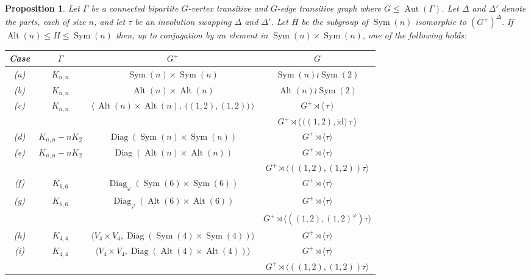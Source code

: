 \documentclass[11pt]{amsart}
\newtheorem{proposition}[theorem]{Proposition}
\DeclareMathOperator{\Sym}{Sym}
\DeclareMathOperator{\Alt}{Alt}
\DeclareMathOperator{\Aut}{Aut}
\DeclareMathOperator{\Diag}{Diag}
\begin{document}
\begin{proposition}\label{group-cases}
    Let $\Gamma$ be a connected bipartite $G$-vertex transitive and $G$-edge transitive graph where $G\leqslant \Aut(\Gamma)$. Let $\Delta$ and $\Delta'$ denote the parts, each of size $n$, and let $\tau$ be an involution swapping $\Delta$ and $\Delta'$. Let $H$ be the subgroup of $\Sym(n)$ isomorphic to  $(G^+)^\Delta$.
    If $\Alt(n)\leqslant H\leqslant \Sym(n)$ then, up to conjugation by an element in  $\Sym(n)\times \Sym(n)$, one of the following holds:
    \begin{table}[ht]
        \centering
        \begin{tabular}{c|ccc}
         Case&\(\Gamma\)&\(G^+\)&\(G\)  \\
         \hline
         (a) &\(K_{n,n}\)&\(\Sym(n) \times \Sym(n)\)&\(\Sym(n)\wr\Sym(2)\)\\
         \hline
         (b)&\(K_{n,n}\)&\(\Alt(n)\times \Alt(n)\)&\(\Alt(n)\wr\Sym(2)\)\\
         \hline
         (c)&\(K_{n,n}\)&\(\bigl\langle\, \Alt(n)\times \Alt(n),~ \bigl((1,2),(1,2)\bigr) \,\bigr\rangle\)&\(G^+\rtimes \langle\, \tau \,\rangle\)\\
         &&&\(G^+\rtimes \bigl\langle\, \bigl( (1,2), \mathrm{id} \bigr) \,\tau \,\bigr\rangle\)\\
         \hline
         (d)&\(K_{n,n}-nK_2\)&\(\Diag(\Sym(n)\times\Sym(n))\)&\(G^+\rtimes\langle\tau\rangle\)\\
         \hline
         (e)&\(K_{n,n}-nK_2\)&\(\Diag(\Alt(n)\times\Alt(n))\)&\(G^+\rtimes\langle\tau\rangle\)\\
         &&&\(G^+\rtimes \langle ((1,2),(1,2))\tau\rangle\)\\
         \hline
         (f)&\(K_{6,6}\)&\(\Diag_\varphi(\Sym(6)\times\Sym(6))\)&\(G^+\rtimes\langle \tau\rangle\)\\
         \hline
         (g)&\(K_{6,6}\)&\(\Diag_\varphi(\Alt(6)\times\Alt(6))\)&\(G^+\rtimes\langle \tau\rangle\)\\
         &&&\(G^+\rtimes\langle((1,2),(1,2)^\varphi) \tau\rangle\)\\
         \hline
         (h)&\(K_{4,4}\)&\(\langle V_4\times V_4,\Diag(\Sym(4)\times\Sym(4))\rangle\)&\(G^+\rtimes\langle\tau\rangle\)\\
         \hline
         (i)&\(K_{4,4}\)&\(\langle V_4\times V_4,\Diag(\Alt(4)\times\Alt(4))\rangle\)&\(G^+\rtimes\langle\tau\rangle\)\\
         &&&\(G^+\rtimes \langle ((1,2),(1,2))\tau\rangle\)\\
         

\end{tabular}
\end{table}
\end{proposition}
\end{document}
